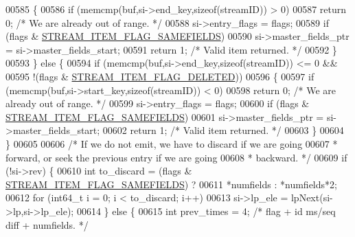 \begin{DoxyCode}
{00585                 \{
00586                     \textcolor{keywordflow}{if} (memcmp(buf,si->end\_key,\textcolor{keyword}{sizeof}(streamID)) > 0)
00587                         \textcolor{keywordflow}{return} 0; \textcolor{comment}{/* We are already out of range. */}
00588                     si->entry\_flags = flags;
00589                     \textcolor{keywordflow}{if} (flags & \hyperlink{t__stream_8c_a6977b456a646762a7650d432a06dc6c5}{STREAM\_ITEM\_FLAG\_SAMEFIELDS})
00590                         si->master\_fields\_ptr = si->master\_fields\_start;
00591                     \textcolor{keywordflow}{return} 1; \textcolor{comment}{/* Valid item returned. */}
00592                 \}
00593             \} \textcolor{keywordflow}{else} \{
00594                 \textcolor{keywordflow}{if} (memcmp(buf,si->end\_key,\textcolor{keyword}{sizeof}(streamID)) <= 0 &&
00595                     !(flags & \hyperlink{t__stream_8c_ad2bde2408044756f3f418ae3c72e575f}{STREAM\_ITEM\_FLAG\_DELETED}))
00596                 \{
00597                     \textcolor{keywordflow}{if} (memcmp(buf,si->start\_key,\textcolor{keyword}{sizeof}(streamID)) < 0)
00598                         \textcolor{keywordflow}{return} 0; \textcolor{comment}{/* We are already out of range. */}
00599                     si->entry\_flags = flags;
00600                     \textcolor{keywordflow}{if} (flags & \hyperlink{t__stream_8c_a6977b456a646762a7650d432a06dc6c5}{STREAM\_ITEM\_FLAG\_SAMEFIELDS})
00601                         si->master\_fields\_ptr = si->master\_fields\_start;
00602                     \textcolor{keywordflow}{return} 1; \textcolor{comment}{/* Valid item returned. */}
00603                 \}
00604             \}
00605 
00606             \textcolor{comment}{/* If we do not emit, we have to discard if we are going}
00607 \textcolor{comment}{             * forward, or seek the previous entry if we are going}
00608 \textcolor{comment}{             * backward. */}
00609             \textcolor{keywordflow}{if} (!si->rev) \{
00610                 \textcolor{keywordtype}{int} to\_discard = (flags & \hyperlink{t__stream_8c_a6977b456a646762a7650d432a06dc6c5}{STREAM\_ITEM\_FLAG\_SAMEFIELDS}) ?
00611                                     *numfields : *numfields*2;
00612                 \textcolor{keywordflow}{for} (int64\_t i = 0; i < to\_discard; i++)
00613                     si->lp\_ele = lpNext(si->lp,si->lp\_ele);
00614             \} \textcolor{keywordflow}{else} \{
00615                 \textcolor{keywordtype}{int} prev\_times = 4; \textcolor{comment}{/* flag + id ms/seq diff + numfields. */}
}
\end{DoxyCode}
